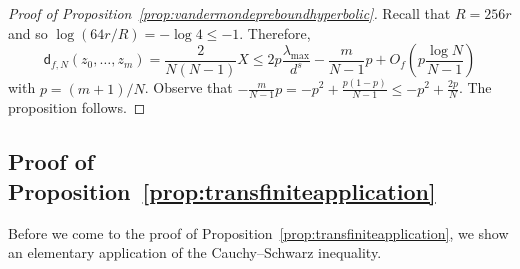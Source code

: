\documentclass[12pt,oneside,a4]{amsart}
\numberwithin{maincounter}{section}
\numberwithin{equation}{section}
\begin{document}
\begin{proof}[Proof of Proposition~\ref{prop:vandermondepreboundhyperbolic}]
  Recall that $R=256r$ and so $\log(64r/R)=-\log 4\le -1$.
  Therefore,
  \begin{equation*}
    \mathsf{d}_{f,N}(z_0,\ldots,z_m)=\frac{2}{N(N-1)}X
    \le 2p\frac{\lambda_{\mathrm{max}}}{d^s} - \frac{m}{N-1}p +O_f\left(p\frac{\log N}{N-1}\right)
  \end{equation*}
  with $p=(m+1)/N$.
  Observe that 
  $-\frac{m}{N-1}p =-p^2 + \frac{p(1-p)}{N-1} \le
  -p^2 + \frac{2p}{N}$.
  The proposition follows.
\end{proof}


\subsection{Proof of Proposition~\ref{prop:transfiniteapplication}}

Before we come to the proof of
Proposition~\ref{prop:transfiniteapplication}, we show
an elementary application of the  Cauchy--Schwarz inequality.
\end{document}
